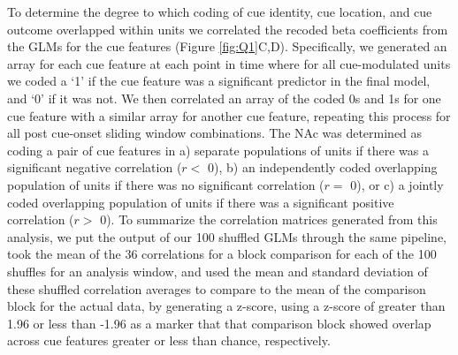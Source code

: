\documentclass[11pt]{article}
\begin{document}
To determine the degree to which coding of cue identity, cue location, and cue outcome overlapped within units we correlated the recoded beta coefficients from the GLMs for the cue features (Figure \ref{fig:Q1}C,D). Specifically, we generated an array for each cue feature at each point in time where for all cue-modulated units we coded a `1' if the cue feature was a significant predictor in the final model, and `0' if it was not. We then correlated an array of the coded 0s and 1s for one cue feature with a similar array for another cue feature, repeating this process for all post cue-onset sliding window combinations. The NAc was determined as coding a pair of cue features in a) separate populations of units if there was a significant negative correlation ($r < $ 0), b) an independently coded overlapping population of units if there was no significant correlation ($r = $ 0), or c) a jointly coded overlapping population of units if there was a significant positive correlation ($r > $ 0). To summarize the correlation matrices generated from this analysis, we put the output of our 100 shuffled GLMs through the same pipeline, took the mean of the 36 correlations for a block comparison for each of the 100 shuffles for an analysis window, and used the mean and standard deviation of these shuffled correlation averages to compare to the mean of the comparison block for the actual data, by generating a z-score, using a z-score of greater than 1.96 or less than -1.96 as a marker that that comparison block showed overlap across cue features greater or less than chance, respectively.
\end{document}
